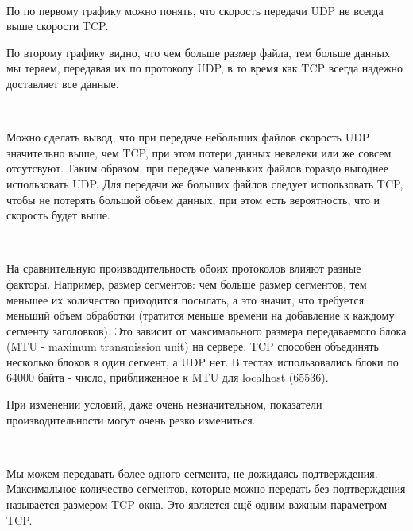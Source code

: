 \documentclass{article}
\begin{document}
~\

По по первому графику можно понять, что скорость передачи UDP не всегда выше скорости TCP.

По второму графику видно, что чем больше размер файла, тем больше данных мы теряем, передавая их по протоколу UDP, в то время как TCP всегда надежно доставляет все данные.

~\

Можно сделать вывод, что при передаче небольших файлов скорость UDP значительно выше, чем TCP, при этом потери данных невелеки или же совсем отсутсвуют. Таким образом, при передаче маленьких файлов гораздо выгоднее использовать UDP.
Для передачи же больших файлов следует использовать TCP, чтобы не потерять большой объем данных, при этом есть вероятность, что и скорость будет выше.

~\

На сравнительную производительность обо­их протоколов влияют разные факторы. Например, размер сегментов: чем больше размер сегментов, тем меньшее их количество приходится посылать, а это значит, что требуется меньший объем обработки (тратится меньше времени на добавление к каждому сегменту заголовков). Это зависит от максимального размера передаваемого блока (MTU - maximum transmission unit) на сервере. TCP способен объединять несколько блоков в один сегмент, а UDP нет.
В тестах использовались блоки по 64000 байта - число, приближенное к MTU для localhost (65536).

При изменении условий, даже очень незначительном, показатели производительности могут очень резко измениться.

~\

Мы можем передавать более одного сегмента, не дожидаясь подтверждения. Максимальное количество сегментов, которые можно передать без подтверждения называется размером TCP-окна. Это является ещё одним важным параметром TCP.
\end{document}
